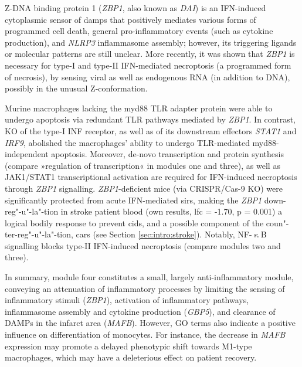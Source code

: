 Z-DNA binding protein 1 (\emph{ZBP1}, also known as \emph{DAI}) is an IFN-induced cytoplasmic sensor of \acp{damp} that positively mediates various forms of programmed cell death, general pro-inflammatory events (such as cytokine production), and \emph{NLRP3} inflammasome assembly; however, its triggering ligands or molecular patterns are still unclear.\cite{Kuriakose2018} More recently, it was shown that \emph{ZBP1} is necessary for type-I and type-II IFN-mediated necroptosis (a programmed form of necrosis),\cite{Yang2019} by sensing viral as well as endogenous RNA (in addition to DNA), possibly in the unusual Z-conformation.\cite{Maelfait2017} 

Murine macrophages lacking the \ac{myd88} TLR adapter protein were able to undergo apoptosis via redundant TLR pathways mediated by \emph{ZBP1}. In contrast, KO of the type-I INF receptor, as well as of its downstream effectors \emph{STAT1} and \emph{IRF9}, abolished the macrophages' ability to undergo TLR-mediated \ac{myd88}-independent apoptosis.\cite{Kuriakose2016} Moreover, de-novo transcription and protein synthesis (compare »regulation of transcription« in modules one and three), as well as JAK1/STAT1 transcriptional activation are required for IFN-induced necroptosis through \emph{ZBP1} signalling.\cite{Yang2019} \emph{ZBP1}-deficient mice (via CRISPR/Cas-9 KO) were significantly protected from acute IFN-mediated \acf{sirs},\cite{Yang2019} making the \emph{ZBP1} down-reg"-u"-la"-tion in stroke patient blood (own results, \ac{lfc} = -1.70, p = 0.001) a logical bodily response to prevent \acf{cids}, and a possible component of the coun"-ter-reg"-u"-la"-tion, \acf{cars} (see Section \ref{sec:intro:stroke}). Notably, NF-$\upkappa$B signalling blocks type-II IFN-induced necroptosis (compare modules two and three).\cite{Thapa2011}


In summary, module four constitutes a small, largely anti-inflammatory module, conveying an attenuation of inflammatory processes by limiting the sensing of inflammatory stimuli (\emph{ZBP1}), activation of inflammatory pathways, inflammasome assembly and cytokine production (\emph{GBP5}), and clearance of DAMPs in the infarct area (\emph{MAFB}). However, GO terms also indicate a positive influence on differentiation of monocytes. For instance, the decrease in \emph{MAFB} expression may promote a delayed phenotypic shift towards M1-type macrophages, which may have a deleterious effect on patient recovery.

